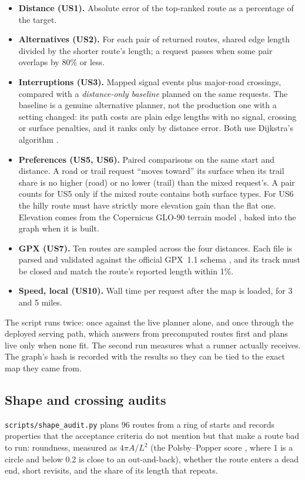\begin{itemize}
\item \textbf{Distance (US1).} Absolute error of the top-ranked route as a
  percentage of the target.
\item \textbf{Alternatives (US2).} For each pair of returned routes, shared
  edge length divided by the shorter route's length; a request passes when
  some pair overlaps by 80\% or less.
\item \textbf{Interruptions (US3).} Mapped signal events plus major-road
  crossings, compared with a \emph{distance-only baseline} planned on the
  same requests. The baseline is a genuine alternative planner, not the
  production one with a setting changed: its path costs are plain edge
  lengths with no signal, crossing or surface penalties, and it ranks only
  by distance error. Both use Dijkstra's algorithm
  \citep{dijkstra1959note}.
\item \textbf{Preferences (US5, US6).} Paired comparisons on the same start
  and distance. A road or trail request ``moves toward'' its surface when its
  trail share is no higher (road) or no lower (trail) than the mixed
  request's. A pair counts for US5 only if the mixed route contains both
  surface types. For US6 the hilly route must have strictly more elevation
  gain than the flat one. Elevation comes from the Copernicus GLO-90 terrain
  model \citep{copernicus2022dem}, baked into the graph when it is built.
\item \textbf{GPX (US7).} Ten routes are sampled across the four distances.
  Each file is parsed and validated against the official GPX~1.1 schema
  \citep{topografix2004gpx}, and its track must be closed and match the
  route's reported length within 1\%.
\item \textbf{Speed, local (US10).} Wall time per request after the map is
  loaded, for 3 and 5 miles.
\end{itemize}

The script runs twice: once against the live planner alone, and once through
the deployed serving path, which answers from precomputed routes first and
plans live only when none fit. The second run measures what a runner actually
receives. The graph's hash is recorded with the results so they can be tied
to the exact map they came from.

\subsection{Shape and crossing audits}
\texttt{scripts/shape\_audit.py} plans 96 routes from a ring of starts and
records properties that the acceptance criteria do not mention but that make
a route bad to run: roundness, measured as $4\pi A/L^2$ (the Polsby--Popper
score \citep{polsby1991third}, where 1 is a circle and below 0.2 is close to
an out-and-back), whether the route enters a dead end, short revisits, and the
share of its length that repeats.

